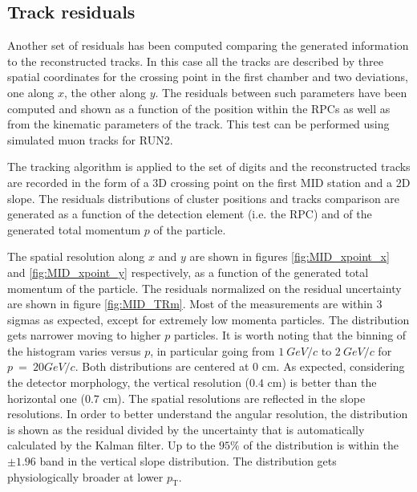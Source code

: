 \subsection{Track residuals}
Another set of residuals has been computed comparing the generated information to the reconstructed tracks.
In this case all the tracks are described by three spatial coordinates for the crossing point in the first chamber and two deviations, one along $x$, the other along $y$.
The residuals between such parameters have been computed and shown as a function of the position within the RPCs as well as from the kinematic parameters of the track.
This test can be performed using simulated muon tracks for RUN2.

The tracking algorithm is applied to the set of digits and the reconstructed tracks are recorded in the form of a 3D crossing point on the first MID station and a 2D slope.
The residuals distributions of cluster positions and tracks comparison are generated as a function of the detection element (i.e. the RPC) and of the generated total momentum $p$ of the particle.

The spatial resolution along $x$ and $y$ are shown in figures \ref{fig:MID_xpoint_x} and \ref{fig:MID_xpoint_y} respectively, as a function of the generated total momentum of the particle.
The residuals normalized on the residual uncertainty are shown in figure \ref{fig:MID_TRm}.
Most of the measurements are within 3 sigmas as expected, except for extremely low momenta particles.
The distribution gets narrower moving to higher $p$ particles.
It is worth noting that the binning of the histogram varies versus $p$, in particular going from $1\ GeV/c$ to $2\ GeV/c$ for $p\ =\ 20 GeV/c$.
Both distributions are centered at $0$ cm.
As expected, considering the detector morphology, the vertical resolution ($0.4$ cm) is better than the horizontal one ($0.7$ cm).
The spatial resolutions are reflected in the slope resolutions.
In order to better understand the angular resolution, the distribution is shown as the residual divided by the uncertainty that is automatically calculated by the Kalman filter.
Up to the $95\%$ of the distribution is within the $\pm1.96$ band in the vertical slope distribution.
The distribution gets physiologically broader at lower $p_\mathrm{T}$.

